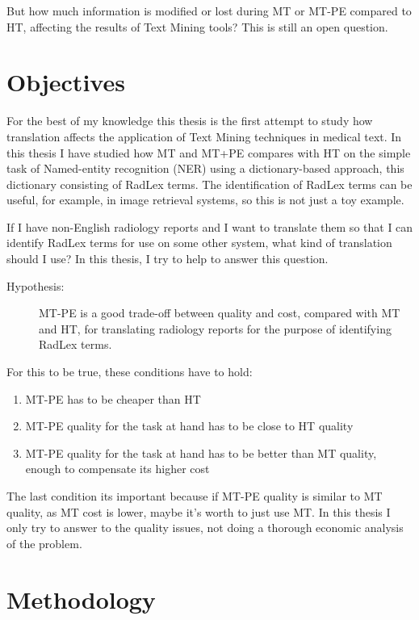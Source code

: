 But how much information is modified or lost during MT or MT-PE compared to HT, affecting the results of Text Mining tools? This is still an open question. 

\section{Objectives}

For the best of my knowledge this thesis is the first attempt to study how translation affects the application of Text Mining techniques in medical text. In this thesis I have studied how MT and MT+PE compares with HT on the simple task of Named-entity recognition (NER) using a dictionary-based approach, this dictionary consisting of RadLex terms. The identification of RadLex terms can be useful, for example, in image retrieval \citep{Gerstmair2012} systems, so this is not just a toy example. 

If I have non-English radiology reports and I want to translate them so that I can identify RadLex terms for use on some other system, what kind of translation should I use? In this thesis, I try to help to answer this question. 

\newcommand{\hypothesis}{
\begin{description}
	\item[Hypothesis:] MT-PE is a good trade-off between quality and cost, compared with MT and HT, for translating radiology reports for the purpose of identifying RadLex terms. 
\end{description}
}
\hypothesis

For this to be true, these conditions have to hold:

\begin{enumerate}
	\item MT-PE has to be cheaper than HT
	\item MT-PE quality for the task at hand has to be close to HT quality
	\item MT-PE quality for the task at hand has to be better than MT quality, enough to compensate its higher cost
\end{enumerate}

The last condition its important because if MT-PE quality is similar to MT quality, as MT cost is lower, maybe it's worth to just use MT. In this thesis I only try to answer to the quality issues, not doing a thorough economic analysis of the problem. 

\section{Methodology}

